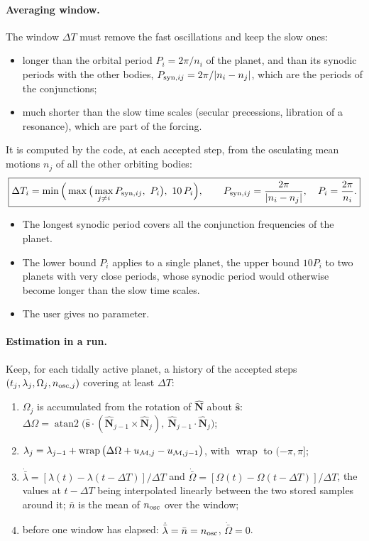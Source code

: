 \paragraph{Averaging window.} The window $\Delta T$ must remove the fast oscillations and keep the slow ones:
\begin{itemize}
  \item longer than the orbital period $P_i=2\pi/n_i$ of the planet, and than its synodic periods with the other bodies, $P_{{\rm syn},ij}=2\pi/|n_i-n_j|$, which are the periods of the conjunctions;
  \item much shorter than the slow time scales (secular precessions, libration of a resonance), which are part of the forcing.
\end{itemize}
It is computed by the code, at each accepted step, from the osculating mean motions $n_j$ of all the other orbiting bodies:
\begin{equation}
  \boxed{\Delta T_i=\min\Big(\max\big(\max_{j\neq i}P_{{\rm syn},ij},\ P_i\big),\ 10\,P_i\Big),\qquad P_{{\rm syn},ij}=\frac{2\pi}{|n_i-n_j|},\quad P_i=\frac{2\pi}{n_i}.} \label{eq:window}
\end{equation}
\begin{itemize}
  \item The longest synodic period covers all the conjunction frequencies of the planet.
  \item The lower bound $P_i$ applies to a single planet, the upper bound $10P_i$ to two planets with very close periods, whose synodic period would otherwise become longer than the slow time scales.
  \item The user gives no parameter.
\end{itemize}

\paragraph{Estimation in a run.} Keep, for each tidally active planet, a history of the accepted steps $(t_j,\lambda_j,\Omega_j,n_{{\rm osc},j})$ covering at least $\Delta T$:
\begin{enumerate}
  \item $\Omega_j$ is accumulated from the rotation of $\hat{\mathbf N}$ about $\hat{\mathbf s}$: $\Delta\Omega=\operatorname{atan2}\big(\hat{\mathbf s}\cdot(\hat{\mathbf N}_{j-1}\times\hat{\mathbf N}_j),\ \hat{\mathbf N}_{j-1}\cdot\hat{\mathbf N}_j\big)$;
  \item $\lambda_j=\lambda_{j-1}+\operatorname{wrap}\big(\Delta\Omega+u_{\mathcal{M},j}-u_{\mathcal{M},j-1}\big)$, with $\operatorname{wrap}$ to $(-\pi,\pi]$;
  \item $\dot{\bar\lambda}=[\lambda(t)-\lambda(t-\Delta T)]/\Delta T$ and $\dot{\bar\Omega}=[\Omega(t)-\Omega(t-\Delta T)]/\Delta T$, the values at $t-\Delta T$ being interpolated linearly between the two stored samples around it; $\bar n$ is the mean of $n_{\rm osc}$ over the window;
  \item before one window has elapsed: $\dot{\bar\lambda}=\bar n=n_{\rm osc}$, $\dot{\bar\Omega}=0$.
\end{enumerate}

